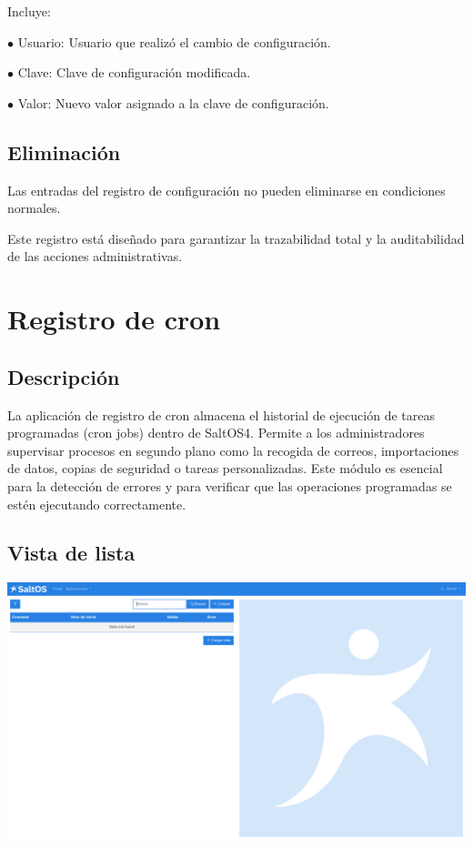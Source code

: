 \documentclass[a4paper]{article}
\begin{document}
Incluye:

\begin{compactitem}
\item[\color{myblue}$\bullet$] Usuario: Usuario que realizó el cambio de configuración.
\item[\color{myblue}$\bullet$] Clave: Clave de configuración modificada.
\item[\color{myblue}$\bullet$] Valor: Nuevo valor asignado a la clave de configuración.
\end{compactitem}

\hypertarget{toc10}{}
\subsection{Eliminación}

Las entradas del registro de configuración no pueden eliminarse en condiciones normales.

Este registro está diseñado para garantizar la trazabilidad total y la auditabilidad de las acciones administrativas.


\hypertarget{toc11}{}
\section{Registro de cron}

\hypertarget{toc12}{}
\subsection{Descripción}

La aplicación de registro de cron almacena el historial de ejecución de tareas programadas (cron jobs) dentro de SaltOS4.
Permite a los administradores supervisar procesos en segundo plano como la recogida de correos, importaciones de datos, copias de seguridad o tareas personalizadas.
Este módulo es esencial para la detección de errores y para verificar que las operaciones programadas se estén ejecutando correctamente.

\hypertarget{toc13}{}
\subsection{Vista de lista}

\begin{center}\includegraphics[width=1\textwidth]{../ujest/snaps/test-screenshots-js-screenshots-common-cronlog-list-es-es-1-snap.png}\end{center}
\end{document}

